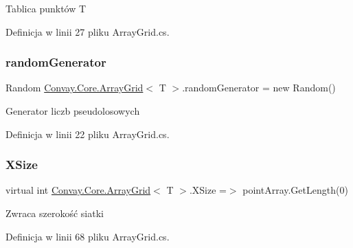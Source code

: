 Tablica punktów T 



Definicja w linii 27 pliku Array\+Grid.\+cs.

\hypertarget{class_convay_1_1_core_1_1_array_grid_ae591bc179fd709c4d73eeb899a973d19}{}\label{class_convay_1_1_core_1_1_array_grid_ae591bc179fd709c4d73eeb899a973d19} 
\subsubsection{\texorpdfstring{random\+Generator}{randomGenerator}}
{\footnotesize\ttfamily Random \hyperlink{class_convay_1_1_core_1_1_array_grid}{Convay.\+Core.\+Array\+Grid}$<$ T $>$.random\+Generator = new Random()\hspace{0.3cm}{\ttfamily [protected]}}



Generator liczb pseudolosowych 



Definicja w linii 22 pliku Array\+Grid.\+cs.

\hypertarget{class_convay_1_1_core_1_1_array_grid_a4850c93797b02a67509f068bb3c2b0c0}{}\label{class_convay_1_1_core_1_1_array_grid_a4850c93797b02a67509f068bb3c2b0c0} 
\subsubsection{\texorpdfstring{X\+Size}{XSize}}
{\footnotesize\ttfamily virtual int \hyperlink{class_convay_1_1_core_1_1_array_grid}{Convay.\+Core.\+Array\+Grid}$<$ T $>$.X\+Size =$>$ point\+Array.\+Get\+Length(0)}



Zwraca szerokość siatki 



Definicja w linii 68 pliku Array\+Grid.\+cs.

\hypertarget{class_convay_1_1_core_1_1_array_grid_a315d51b878cb8952f0578cffd13546bd}{}\label{class_convay_1_1_core_1_1_array_grid_a315d51b878cb8952f0578cffd13546bd} 

